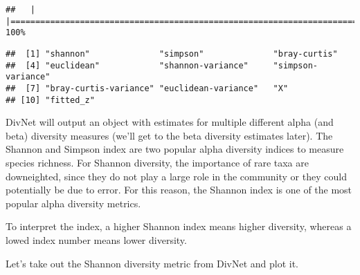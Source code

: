 \documentclass[]{article}
\newenvironment{Shaded}{\begin{snugshade}}{\end{snugshade}}
\newcommand{\CommentTok}[1]{\textcolor[rgb]{0.56,0.35,0.01}{\textit{#1}}}
\newcommand{\NormalTok}[1]{#1}
\newcommand{\OperatorTok}[1]{\textcolor[rgb]{0.81,0.36,0.00}{\textbf{#1}}}
\newcommand{\StringTok}[1]{\textcolor[rgb]{0.31,0.60,0.02}{#1}}
\begin{document}
\begin{verbatim}
##   |                                                                              |======================================================================| 100%
\end{verbatim}

\begin{Shaded}
\end{Shaded}

\begin{verbatim}
##  [1] "shannon"              "simpson"              "bray-curtis"         
##  [4] "euclidean"            "shannon-variance"     "simpson-variance"    
##  [7] "bray-curtis-variance" "euclidean-variance"   "X"                   
## [10] "fitted_z"
\end{verbatim}

DivNet will output an object with estimates for multiple different alpha
(and beta) diversity measures (we'll get to the beta diversity estimates
later). The Shannon and Simpson index are two popular alpha diversity
indices to measure species richness. For Shannon diversity, the
importance of rare taxa are downeighted, since they do not play a large
role in the community or they could potentially be due to error. For
this reason, the Shannon index is one of the most popular alpha
diversity metrics.

To interpret the index, a higher Shannon index means higher diversity,
whereas a lowed index number means lower diversity.

Let's take out the Shannon diversity metric from DivNet and plot it.
\end{document}
